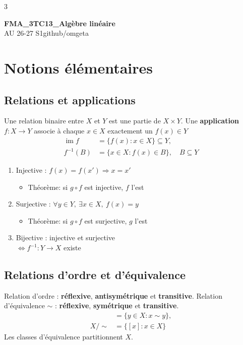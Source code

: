 \documentclass[12pt, a4paper]{article}
\newcommand{\mytitle}{FMA\_3TC13\_Algèbre linéaire}
\newcommand{\myauthor}{github/omgeta}
\newcommand{\mydate}{AU 26-27 S1}
\newcommand{\im}{\operatorname{im}}
\begin{document}
\raggedright
\footnotesize
\begin{multicols*}{3}
\setlength{\premulticols}{1pt}
\setlength{\postmulticols}{1pt}
\setlength{\multicolsep}{1pt}
\setlength{\columnsep}{2pt}

{\normalsize{\textbf{\mytitle}}}\\
{\footnotesize{\mydate\hspace{2pt}\textemdash\hspace{2pt}\myauthor}}
\section{Notions élémentaires}
\subsection{Relations et applications}
Une relation binaire entre $X$ et $Y$ est une partie de $X\times Y$. Une \textbf{application} $f:X\to Y$ associe à chaque $x\in X$ exactement un $f(x)\in Y$ 
\begin{align*}
\im f&=\{f(x):x\in X\}\subseteq Y,\\
f^{-1}(B)&=\{x\in X:f(x)\in B\},\quad B\subseteq Y
\end{align*}
\begin{enumerate}
\item Injective : $f(x)=f(x')\Rightarrow x=x'$
  \begin{itemize}
    \item Théorème: si $g\circ f$ est injective, $f$ l'est 
  \end{itemize}
\item Surjective : $\forall y\in Y,\ \exists x\in X,\ f(x)=y$
  \begin{itemize}
    \item Théorème: si $g\circ f$ est surjective, $g$ l'est 
  \end{itemize}
\item Bijective : injective et surjective\\\hspace{4.25em}$\iff f^{-1}:Y\to X$ existe
\end{enumerate}

\subsection{Relations d'ordre et d'équivalence}
Relation d'ordre : \textbf{réflexive}, \textbf{antisymétrique} et \textbf{transitive}. Relation d'équivalence $\sim$ : \textbf{réflexive}, \textbf{symétrique} et \textbf{transitive}.
\begin{align*}
[x]&=\{y\in X:x\sim y\},\\
X/{\sim}&=\{[x]:x\in X\}
\end{align*}
Les classes d'équivalence partitionnent $X$.


\end{multicols*}
\end{document}
